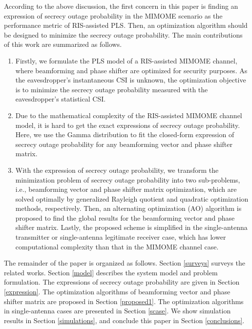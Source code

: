\documentclass[journal]{IEEEtran}
\theoremstyle{definition}
\begin{document}
According to the above discussion, the first concern in this paper is finding an expression of secrecy outage probability in the MIMOME scenario as the performance metric of RIS-assisted PLS. Then, an optimization algorithm should be designed to minimize the secrecy outage probability. The main contributions of this work are summarized as follows.
\begin{enumerate}
\item Firstly, we formulate the PLS model of a RIS-assisted MIMOME channel, where beamforming and phase shifter are optimized for security purposes. As the eavesdropper's instantaneous CSI is unknown, the optimization objective is to minimize the secrecy outage probability measured with the eavesdropper's statistical CSI.  
\item Due to the mathematical complexity of the RIS-assisted MIMOME channel model, it is hard to get the exact expressions of secrecy outage probability. Here, we use the Gamma distribution to fit the closed-form expression of secrecy outage probability for any beamforming vector and phase shifter matrix.
\item With the expression of secrecy outage probability, we transform the minimization problem of secrecy outage probability into two sub-problems, i.e., beamforming vector and phase shifter matrix optimization, which are solved optimally by generalized Rayleigh quotient and quadratic optimization methods, respectively. Then, an alternating optimization (AO) algorithm is proposed to find the global results for the beamforming vector and phase shifter matrix. Lastly, the proposed scheme is simplified in the single-antenna transmitter or single-antenna legitimate receiver case, which has lower computational complexity than that in the MIMOME channel case.
\end{enumerate}

The remainder of the paper is organized as follows. Section \ref{surveys} surveys the related works. Section \ref{model} describes the system model and problem formulation. The expressions of secrecy outage probability are given in Section \ref{expression}. The optimization algorithms of beamforming vector and phase shifter matrix are proposed in Section \ref{proposed1}. The optimization algorithms in single-antenna cases are presented in Section \ref{scase}. We show simulation results in Section \ref{simulations}, and conclude this paper in Section \ref{conclusions}.
\end{document}
